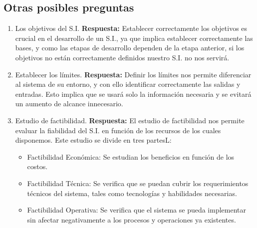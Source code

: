 \documentclass{templateNote}
\begin{document}
\newpage
\subsection{Otras posibles preguntas}
\begin{enumerate}
    \item Los objetivos del S.I.\newline
    \textbf{Respuesta:} Establecer correctamente los objetivos es crucial en el desarrollo de un S.I., ya que implica establecer correctamente las bases, y como las etapas de desarrollo dependen de la etapa anterior, si los objetivos no est\'an correctamente definidos nuestro S.I. no nos servir\'a.

    \item Establecer los l\'imites.\newline
    \textbf{Respuesta:} Definir los l\'imites nos permite diferenciar al sistema de su entorno, y con ello identificar correctamente las salidas y entradas. Esto implica que se usar\'a solo la informaci\'on necesaria y se evitar\'a un aumento de alcance innecesario.

    \item Estudio de factibilidad.\newline
    \textbf{Respuesta:} El estudio de factibilidad nos permite evaluar la fiabilidad del S.I. en funci\'on de los recursos de los cuales disponemos. Este estudio se divide en tres partesL:
    \begin{itemize}
        \item Factibilidad Econ\'omica: Se estudian los beneficios en funci\'on de los costos.
        \item Factibilidad T\'ecnica: Se verifica que se puedan cubrir los requerimientos t\'ecnicos del sistema, tales como tecnolog\'ias y habilidades necesarias.
        \item Factibilidad Operativa: Se verifica que el sistema se pueda implementar sin afectar negativamente a los procesos y operaciones ya existentes.
    \end{itemize}
\end{enumerate}
\end{document}
